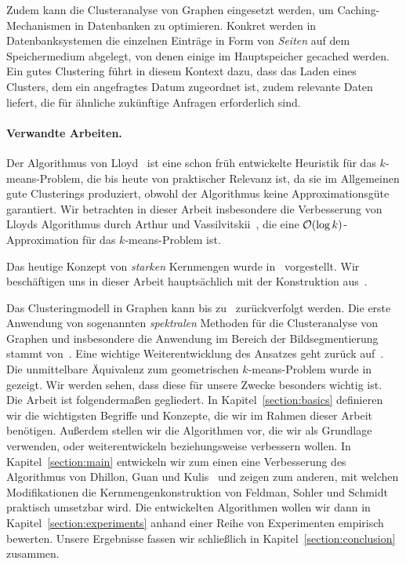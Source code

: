 Zudem kann die Clusteranalyse von Graphen eingesetzt werden, um Caching-Mechanismen in Datenbanken zu optimieren.
Konkret werden in Datenbanksystemen die einzelnen Einträge in Form von \emph{Seiten} auf dem Speichermedium abgelegt,
von denen einige im Hauptspeicher gecached werden. Ein gutes Clustering führt in diesem Kontext dazu, dass das Laden eines
Clusters, dem ein angefragtes Datum zugeordnet ist, zudem relevante Daten liefert, die für ähnliche zukünftige Anfragen
erforderlich sind.

\paragraph{Verwandte Arbeiten.} Der Algorithmus von Lloyd~\cite{Lloyd82} ist eine schon früh entwickelte Heuristik für das
$k$-means-Problem, die bis heute von praktischer Relevanz ist, da sie im Allgemeinen gute Clusterings produziert, obwohl
der Algorithmus keine Approximationsgüte garantiert. Wir betrachten in dieser Arbeit insbesondere die Verbesserung von
Lloyds Algorithmus durch Arthur und Vassilvitskii~\citep{ArthurV07}, die eine $\mathcal{O}(\log k)$-Approximation für das
$k$-means-Problem ist.

Das heutige Konzept von \emph{starken} Kernmengen wurde in~\cite{HarPeledM04} vorgestellt. Wir beschäftigen uns in dieser Arbeit
hauptsächlich mit der Konstruktion aus~\cite{FeldmanSS13,Schmidt14}.

Das Clusteringmodell in Graphen kann bis zu~\cite{KernighanL70} zurückverfolgt werden. Die erste Anwendung von sogenannten
\emph{spektralen} Methoden für die Clusteranalyse von Graphen und insbesondere die Anwendung im Bereich der Bildsegmentierung
stammt von~\cite{ShiM00}. Eine wichtige Weiterentwicklung des Ansatzes geht zurück auf~\cite{NgJW01}. Die unmittelbare
Äquivalenz zum geometrischen $k$-means-Problem wurde in~\cite{DhillonGK04,DhillonGK07} gezeigt. Wir werden sehen, dass diese
für unsere Zwecke besonders wichtig ist.
\absatz
Die Arbeit ist folgendermaßen gegliedert. In Kapitel~\ref{section:basics} definieren wir die wichtigsten Begriffe und
Konzepte, die wir im Rahmen dieser Arbeit benötigen. Außerdem stellen wir die Algorithmen vor, die wir als Grundlage verwenden,
oder weiterentwickeln beziehungsweise verbessern wollen. In Kapitel~\ref{section:main} entwickeln wir zum einen eine
Verbesserung des Algorithmus von Dhillon, Guan und Kulis~\cite{DhillonGK04,DhillonGK07} und zeigen zum anderen, mit welchen
Modifikationen die Kernmengenkonstruktion von Feldman, Sohler und Schmidt~\cite{FeldmanSS13,Schmidt14} praktisch umsetzbar wird.
Die entwickelten Algorithmen wollen wir dann in Kapitel~\ref{section:experiments} anhand einer Reihe von Experimenten empirisch
bewerten. Unsere Ergebnisse fassen wir schließlich in Kapitel~\ref{section:conclusion} zusammen.